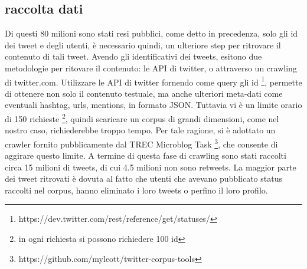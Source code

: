 \subsection{raccolta dati}
Di questi 80 milioni sono stati resi pubblici, come detto in precedenza, solo gli id dei tweet e degli utenti, è necessario quindi, un ulteriore step per ritrovare il contenuto di tali tweet.
Avendo gli identificativi dei tweets, esitono due metodologie per ritovare il contenuto: le API di twitter, o attraverso un crawling di twitter.com.
Utilizzare le API di twitter fornendo come query gli id \footnote{https://dev.twitter.com/rest/reference/get/statuses/}, permette di ottenere non solo il contenuto testuale, ma anche ulteriori meta-dati come eventuali hashtag, urls, mentions, in formato JSON.
Tuttavia vi è un limite orario di 150 richieste \footnote{in ogni richiesta si possono richiedere 100 id}, quindi scaricare un corpus di grandi dimensioni, come nel nostro caso, richiederebbe troppo tempo. Per tale ragione, si è adottato un crawler fornito pubblicamente dal TREC Microblog Task \footnote{https://github.com/myleott/twitter-corpus-tools}, che consente di aggirare questo limite. A termine di questa fase di crawling sono stati raccolti circa 15 milioni di tweets, di cui  4.5 milioni non sono retweets. La maggior parte dei tweet ritrovati è dovuta al fatto   che  utenti che avevano pubblicato status raccolti nel corpus, hanno eliminato i loro tweets o perfino il loro profilo.



 


